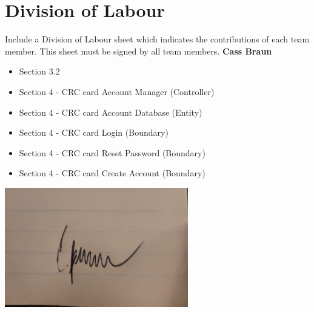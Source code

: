 \documentclass[]{article}
\begin{document}
\section{Division of Labour}
\label{sec:division_of_labour}
Include a Division of Labour sheet which indicates the contributions of each team member. This sheet must be signed by all team members.
\newline
\newline
\textbf{Cass Braun}
\begin{itemize}
    \setlength\itemindent{2em}
    \item Section 3.2
    \item Section 4 - CRC card Account Manager (Controller) 
    \item Section 4 - CRC card Account Database (Entity)
    \item Section 4 - CRC card Login (Boundary)
    \item Section 4 - CRC card Reset Password (Boundary) 
    \item Section 4 - CRC card Create Account (Boundary) \end{itemize} 
\includegraphics[width=0.6\textwidth]{Cass.jpg}
\end{document}
